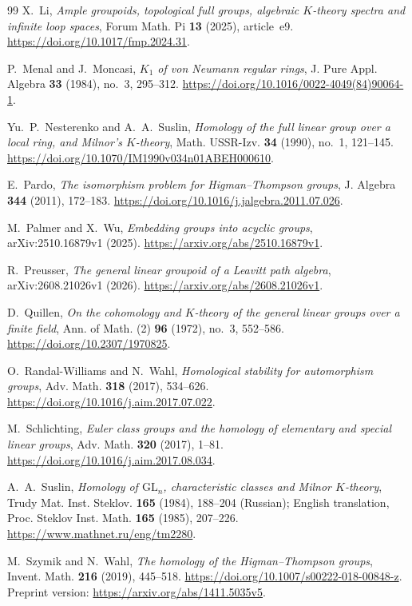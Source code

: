 \documentclass[11pt]{amsart}
\theoremstyle{definition}
\theoremstyle{remark}
\numberwithin{equation}{section}
\begin{document}
\begin{thebibliography}{99}
X.~Li, \emph{Ample groupoids, topological full groups, algebraic $K$-theory spectra and infinite loop spaces}, Forum Math. Pi \textbf{13} (2025), article~e9. \url{https://doi.org/10.1017/fmp.2024.31}.

P.~Menal and J.~Moncasi, \emph{$K_1$ of von Neumann regular rings}, J. Pure Appl. Algebra \textbf{33} (1984), no.~3, 295--312. \url{https://doi.org/10.1016/0022-4049(84)90064-1}.

Yu.~P.~Nesterenko and A.~A.~Suslin, \emph{Homology of the full linear group over a local ring, and Milnor's $K$-theory}, Math. USSR-Izv. \textbf{34} (1990), no.~1, 121--145. \url{https://doi.org/10.1070/IM1990v034n01ABEH000610}.

E.~Pardo, \emph{The isomorphism problem for Higman--Thompson groups}, J. Algebra \textbf{344} (2011), 172--183. \url{https://doi.org/10.1016/j.jalgebra.2011.07.026}.

M.~Palmer and X.~Wu, \emph{Embedding groups into acyclic groups}, arXiv:2510.16879v1 (2025). \url{https://arxiv.org/abs/2510.16879v1}.

R.~Preusser, \emph{The general linear groupoid of a Leavitt path algebra}, arXiv:2608.21026v1 (2026). \url{https://arxiv.org/abs/2608.21026v1}.

D.~Quillen, \emph{On the cohomology and $K$-theory of the general linear groups over a finite field}, Ann. of Math. (2) \textbf{96} (1972), no.~3, 552--586. \url{https://doi.org/10.2307/1970825}.

O.~Randal-Williams and N.~Wahl, \emph{Homological stability for automorphism groups}, Adv. Math. \textbf{318} (2017), 534--626. \url{https://doi.org/10.1016/j.aim.2017.07.022}.

M.~Schlichting, \emph{Euler class groups and the homology of elementary and special linear groups}, Adv. Math. \textbf{320} (2017), 1--81. \url{https://doi.org/10.1016/j.aim.2017.08.034}.

A.~A.~Suslin, \emph{Homology of $\mathrm{GL}_n$, characteristic classes and Milnor $K$-theory}, Trudy Mat. Inst. Steklov. \textbf{165} (1984), 188--204 (Russian); English translation, Proc. Steklov Inst. Math. \textbf{165} (1985), 207--226. \url{https://www.mathnet.ru/eng/tm2280}.

M.~Szymik and N.~Wahl, \emph{The homology of the Higman--Thompson groups}, Invent. Math. \textbf{216} (2019), 445--518. \url{https://doi.org/10.1007/s00222-018-00848-z}. Preprint version: \url{https://arxiv.org/abs/1411.5035v5}.


\end{thebibliography}
\end{document}
